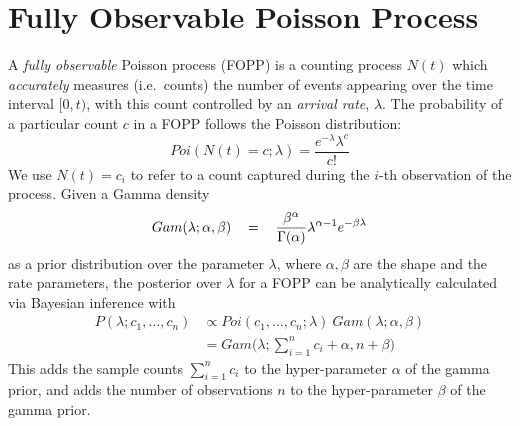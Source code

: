 
\section{Fully Observable Poisson Process}
\label{sec:preliminaries}

A \emph{fully observable} Poisson process (FOPP) is a counting process $N(t)$ which \emph{accurately} measures (i.e.~counts) the number of events appearing over the time interval $[0, t)$, with this count controlled by an \textit{arrival rate}, $\lambda$. The probability of a particular count $c$ in a FOPP follows the Poisson distribution:
\begin{equation}
    \label{eq:pmf_poisson}
	Poi(N(t) = c ; \lambda) = \frac{e ^{-\lambda} \lambda ^{c}}{c!}
\end{equation}
We use $N(t) = c_i$ to refer to a count captured during the $i$-th observation of the process.
Given a Gamma density
\begin{equation}
    \label{eq:pdf_gamma}
    \begin{tabular}{rcl}
        $Gam(\lambda ; \alpha, \beta)$ & = & $\displaystyle\frac{\beta ^{\alpha}}{\Gamma (\alpha)} \lambda ^{\alpha - 1} e^{-\beta \lambda}$ \\ [1ex]
    \end{tabular}
\end{equation}
as a prior distribution over the parameter $\lambda$, where $\alpha, \beta$ are the shape and the rate parameters, the posterior over $\lambda$ for a FOPP can be analytically calculated via Bayesian inference with
\begin{equation}
    \label{eq:posterior_fopp}
    \begin{array}{lll}
        P(\lambda ; c_1, \ldots, c_n) & \varpropto Poi(c_1, \ldots, c_n ; \lambda) ~ Gam(\lambda ; \alpha, \beta) \\
         & = Gam \Bigg(\lambda ; \displaystyle\sum_{i=1}^{n} c_i + \alpha, n + \beta \Bigg)
    \end{array}
\end{equation}
This adds the sample counts $\sum_{i=1}^{n} c_i$ to the hyper-parameter $\alpha$ of the gamma prior, and adds the number of observations $n$ to the hyper-parameter $\beta$ of the gamma prior.
